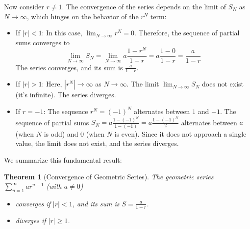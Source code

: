 \documentclass[11pt, letterpaper]{article}
\theoremstyle{plain} %
\newtheorem{theorem}{Theorem}[section] %
\theoremstyle{definition} %
\theoremstyle{remark} %
\newcommand{\abs}[1]{\left|#1\right|} %
\begin{document}
Now consider $r \neq 1$. The convergence of the series depends on the limit of $S_N$ as $N \to \infty$, which hinges on the behavior of the $r^N$ term:
\begin{itemize}
    \item If $\abs{r} < 1$: In this case, $\lim_{N \to \infty} r^N = 0$. Therefore, the sequence of partial sums converges to
    \[ \lim_{N \to \infty} S_N = \lim_{N \to \infty} a \frac{1 - r^N}{1 - r} = a \frac{1 - 0}{1 - r} = \frac{a}{1 - r} \]
    The series converges, and its sum is $\frac{a}{1 - r}$.
    \item If $\abs{r} > 1$: Here, $\abs{r^N} \to \infty$ as $N \to \infty$. The limit $\lim_{N \to \infty} S_N$ does not exist (it's infinite). The series diverges.
    \item If $r = -1$: The sequence $r^N = (-1)^N$ alternates between $1$ and $-1$. The sequence of partial sums $S_N = a\frac{1-(-1)^N}{1 - (-1)} = a\frac{1-(-1)^N}{2}$ alternates between $a$ (when $N$ is odd) and $0$ (when $N$ is even). Since it does not approach a single value, the limit does not exist, and the series diverges.
\end{itemize}

We summarize this fundamental result:

\begin{theorem}[Convergence of Geometric Series]
The geometric series $\sum_{n=1}^{\infty} a r^{n-1}$ (with $a \neq 0$)
\begin{itemize}
    \item converges if $\abs{r} < 1$, and its sum is $S = \frac{a}{1 - r}$.
    \item diverges if $\abs{r} \ge 1$.
\end{itemize}
\end{theorem}
\end{document}
